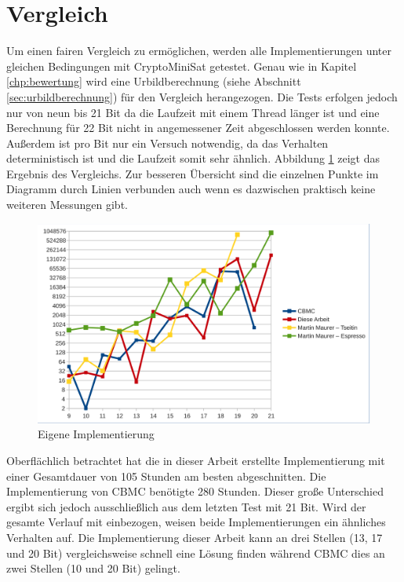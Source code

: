 \section{Vergleich}
\label{sec:vergleich}

Um einen fairen Vergleich zu ermöglichen, werden alle Implementierungen unter gleichen Bedingungen mit CryptoMiniSat
getestet. Genau wie in Kapitel \ref{chp:bewertung} wird eine Urbildberechnung (siehe Abschnitt \ref{sec:urbildberechnung})
für den Vergleich herangezogen. Die Tests erfolgen jedoch nur von neun bis 21 Bit da die Laufzeit mit einem Thread länger
ist und eine Berechnung für 22 Bit nicht in angemessener Zeit abgeschlossen werden konnte. Außerdem ist pro Bit nur ein
Versuch notwendig, da das Verhalten deterministisch ist und die Laufzeit somit sehr ähnlich. Abbildung \ref{fig:eval_final}
zeigt das Ergebnis des Vergleichs. Zur besseren Übersicht sind die einzelnen Punkte im Diagramm durch Linien verbunden auch
wenn es dazwischen praktisch keine weiteren Messungen gibt.
\begin{figure}[!h]
  \centering
  \includegraphics[scale=0.55]{images/eval_final}
  \caption{Eigene Implementierung}
  \label{fig:eval_final}
\end{figure}

Oberflächlich betrachtet hat die in dieser Arbeit erstellte Implementierung mit einer Gesamtdauer von 105 Stunden am besten abgeschnitten.
Die Implementierung von CBMC benötigte 280  Stunden. Dieser große Unterschied ergibt sich jedoch ausschließlich aus dem
letzten Test mit 21 Bit. Wird der gesamte Verlauf mit einbezogen, weisen beide Implementierungen ein ähnliches Verhalten auf. Die
Implementierung dieser Arbeit kann an drei Stellen (13, 17 und 20 Bit) vergleichsweise schnell eine Lösung finden während CBMC dies
an zwei Stellen (10 und 20 Bit) gelingt.

